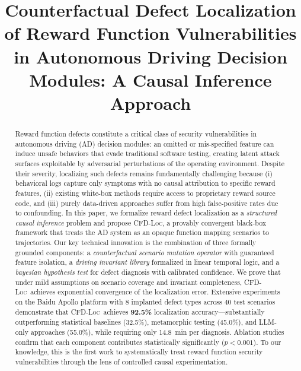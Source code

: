 \documentclass[journal]{IEEEtran}
\title{Counterfactual Defect Localization of Reward Function Vulnerabilities in Autonomous Driving Decision Modules: A Causal Inference Approach}
\author{
\IEEEauthorblockN{\textbf{Wenjia Niu}}
\IEEEauthorblockA{School of Cyberspace Science and Technology\\
Beijing Jiaotong University, Beijing, China 100044\\
Email: Niuwj@bjtu.edu.cn}
}
\theoremstyle{plain}
\theoremstyle{definition}
\theoremstyle{remark}
\newcommand{\methodname}{\textsc{CFD-Loc}}
\begin{document}
\maketitle

\begin{abstract}
\noindent
Reward function defects constitute a critical class of security vulnerabilities in autonomous driving (AD) decision modules: an omitted or mis-specified feature can induce unsafe behaviors that evade traditional software testing, creating latent attack surfaces exploitable by adversarial perturbations of the operating environment. Despite their severity, localizing such defects remains fundamentally challenging because (i) behavioral logs capture only symptoms with no causal attribution to specific reward features, (ii) existing white-box methods require access to proprietary reward source code, and (iii) purely data-driven approaches suffer from high false-positive rates due to confounding. In this paper, we formalize reward defect localization as a \emph{structured causal inference} problem and propose \methodname, a provably convergent black-box framework that treats the AD system as an opaque function mapping scenarios to trajectories. Our key technical innovation is the combination of three formally grounded components: a \emph{counterfactual scenario mutation operator} with guaranteed feature isolation, a \emph{driving invariant library} formalized in linear temporal logic, and a \emph{bayesian hypothesis test} for defect diagnosis with calibrated confidence. We prove that under mild assumptions on scenario coverage and invariant completeness, \methodname\ achieves exponential convergence of the localization error. Extensive experiments on the Baidu Apollo platform with 8 implanted defect types across 40 test scenarios demonstrate that \methodname\ achieves \textbf{92.5\%} localization accuracy---substantially outperforming statistical baselines (32.5\%), metamorphic testing (45.0\%), and LLM-only approaches (55.0\%), while requiring only 14.8~min per diagnosis. Ablation studies confirm that each component contributes statistically significantly ($p<0.001$). To our knowledge, this is the first work to systematically treat reward function security vulnerabilities through the lens of controlled causal experimentation.
\end{abstract}
\end{document}
